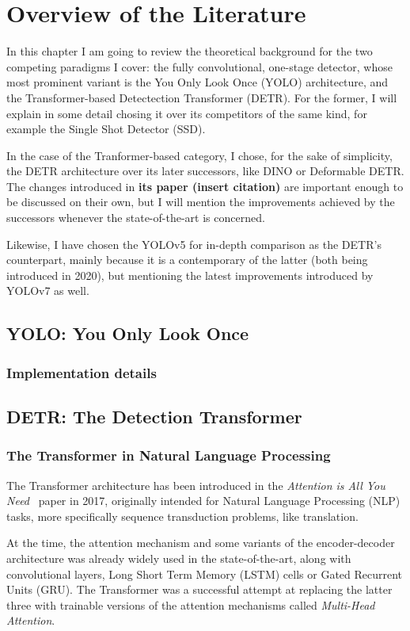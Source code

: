 \chapter{Overview of the Literature}

In this chapter I am going to review the theoretical background for the two competing paradigms I cover: the fully convolutional, one-stage detector, whose most prominent variant is the You Only Look Once (YOLO) architecture, and the Transformer-based Detectection Transformer (DETR). For the former, I will explain in some detail chosing it over its competitors of the same kind, for example the Single Shot Detector (SSD).

In the case of the Tranformer-based category, I chose, for the sake of simplicity, the DETR architecture over its later successors, like DINO or Deformable DETR. The changes introduced in \textbf{its paper (insert citation)} are important enough to be discussed on their own, but I will mention the improvements achieved by the successors whenever the state-of-the-art is concerned.

Likewise, I have chosen the YOLOv5 for in-depth comparison as the DETR's counterpart, mainly because it is a contemporary of the latter (both being introduced in 2020), but mentioning the latest improvements introduced by YOLOv7 as well.

\section{YOLO: You Only Look Once}
\subsection{Implementation details}
\section{DETR: The Detection Transformer}
\subsection{The Transformer in Natural Language Processing}

The Transformer architecture has been introduced in the \textit{Attention is All You Need}~\cite{Transformer} paper in 2017, originally intended for Natural Language Processing (NLP) tasks, more specifically sequence transduction problems, like translation.

At the time, the attention mechanism and some variants of the encoder-decoder architecture was already widely used in the state-of-the-art, along with convolutional layers, Long Short Term Memory (LSTM) cells or Gated Recurrent Units (GRU). The Transformer was a successful attempt at replacing the latter three with trainable versions of the attention mechanisms called \textit{Multi-Head Attention}.

